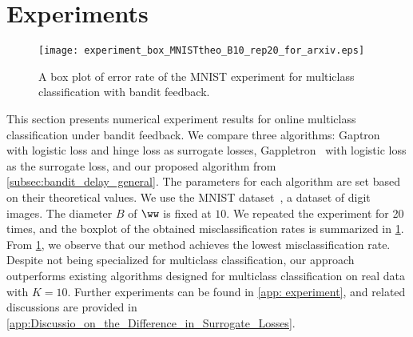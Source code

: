 \section{Experiments}
\label{sec: experiment}
\begin{figure}[t]
    \centering
    \texttt{[image: experiment\_box\_MNISTtheo\_B10\_rep20\_for\_arxiv.eps]}
    \vspace{-10pt}
     \caption{A box plot of error rate of the MNIST experiment for multiclass classification with bandit feedback.
     }
    \label{fig:experiment mnist}
\end{figure}

This section presents numerical experiment results for online multiclass classification  
under bandit feedback.  
We compare three algorithms:  
Gaptron~ with logistic loss and hinge loss as surrogate losses,  
Gappletron~ with logistic loss as the surrogate loss,  
and our proposed algorithm from \cref{subsec:bandit_delay_general}.  
The parameters for each algorithm are set based on their theoretical values.  
We use the MNIST dataset~\citep{lecun2010mnist}, a dataset of digit images.  
The diameter $B$ of $\ww$ is fixed at $10$.  
We repeated the experiment for 20 times, and the boxplot of the obtained misclassification rates is summarized in \cref{fig:experiment mnist}.  
From \cref{fig:experiment mnist}, we observe that our method achieves the lowest misclassification rate.  
Despite not being specialized for multiclass classification,  
our approach outperforms existing algorithms designed for multiclass classification  
on real data with $K = 10$.  
Further experiments can be found in \cref{app: experiment},  
and related discussions are provided in \cref{app:Discussio_on_the_Difference_in_Surrogate_Losses}.












